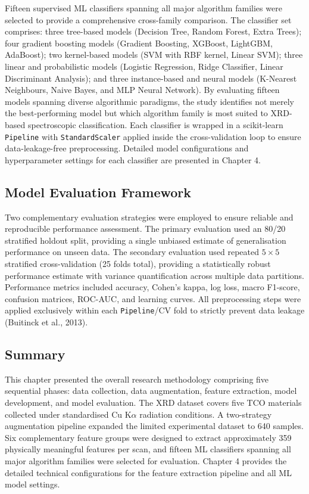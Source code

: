 \documentclass[12pt, oneside]{article} %
\begin{document}
Fifteen supervised ML classifiers spanning all major algorithm families were selected to provide a comprehensive cross-family comparison. The classifier set comprises: three tree-based models (Decision Tree, Random Forest, Extra Trees); four gradient boosting models (Gradient Boosting, XGBoost, LightGBM, AdaBoost); two kernel-based models (SVM with RBF kernel, Linear SVM); three linear and probabilistic models (Logistic Regression, Ridge Classifier, Linear Discriminant Analysis); and three instance-based and neural models (K-Nearest Neighbours, Naive Bayes, and MLP Neural Network). By evaluating fifteen models spanning diverse algorithmic paradigms, the study identifies not merely the best-performing model but which algorithm family is most suited to XRD-based spectroscopic classification. Each classifier is wrapped in a scikit-learn \texttt{Pipeline} with \texttt{StandardScaler} applied inside the cross-validation loop to ensure data-leakage-free preprocessing. Detailed model configurations and hyperparameter settings for each classifier are presented in Chapter 4.


\subsection{Model Evaluation Framework}

Two complementary evaluation strategies were employed to ensure reliable and reproducible performance assessment. The primary evaluation used an 80/20 stratified holdout split, providing a single unbiased estimate of generalisation performance on unseen data. The secondary evaluation used repeated $5 \times 5$ stratified cross-validation (25 folds total), providing a statistically robust performance estimate with variance quantification across multiple data partitions. Performance metrics included accuracy, Cohen's kappa, log loss, macro F1-score, confusion matrices, ROC-AUC, and learning curves. All preprocessing steps were applied exclusively within each \texttt{Pipeline}/CV fold to strictly prevent data leakage (Buitinck et al., 2013).


\subsection{Summary}

This chapter presented the overall research methodology comprising five sequential phases: data collection, data augmentation, feature extraction, model development, and model evaluation. The XRD dataset covers five TCO materials collected under standardised Cu K$\alpha$ radiation conditions. A two-strategy augmentation pipeline expanded the limited experimental dataset to 640 samples. Six complementary feature groups were designed to extract approximately 359 physically meaningful features per scan, and fifteen ML classifiers spanning all major algorithm families were selected for evaluation. Chapter 4 provides the detailed technical configurations for the feature extraction pipeline and all ML model settings.
\end{document}
